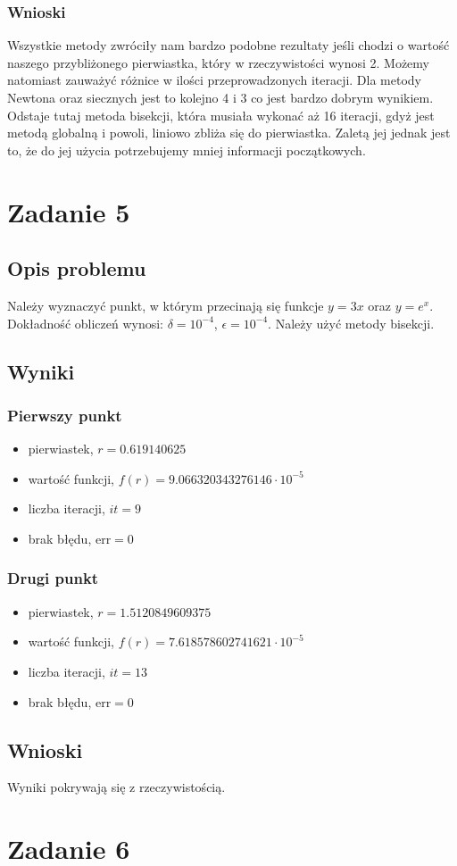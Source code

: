 \documentclass{article}
\begin{document}
\subsubsection*{Wnioski}
	Wszystkie metody zwróciły nam bardzo podobne rezultaty jeśli chodzi o wartość naszego przybliżonego pierwiastka, który w rzeczywistości wynosi 2. Możemy natomiast zauważyć różnice w ilości przeprowadzonych iteracji. Dla metody Newtona oraz siecznych jest to kolejno 4 i 3 co jest bardzo dobrym wynikiem. Odstaje tutaj metoda bisekcji, która musiała wykonać aż 16 iteracji, gdyż jest metodą globalną i powoli, liniowo zbliża się do pierwiastka. Zaletą jej jednak jest to, że do jej użycia potrzebujemy mniej informacji początkowych.

\section*{Zadanie 5}
\subsection*{Opis problemu}
	Należy wyznaczyć punkt, w którym przecinają się funkcje $y = 3x$ oraz $y = e^x$. Dokładność obliczeń wynosi: $\delta = 10^{-4}$, $\epsilon = 10^{-4}$. Należy użyć metody bisekcji.
\subsection*{Wyniki}
\subsubsection*{Pierwszy punkt}
	\begin{itemize}
		\item pierwiastek, $r = 0.619140625$
	    \item wartość funkcji, $f(r) = 9.066320343276146 \cdot 10^{-5}$
	    \item liczba iteracji, $it = 9$
	    \item brak błędu, $\mathrm{err} = 0$
	\end{itemize}
\subsubsection*{Drugi punkt}
	\begin{itemize}
		\item pierwiastek, $r = 1.5120849609375$
	    \item wartość funkcji, $f(r) = 7.618578602741621 \cdot 10^{-5}$
	    \item liczba iteracji, $it = 13$
	    \item brak błędu, $\mathrm{err} = 0$
	\end{itemize}
\subsection*{Wnioski}
	Wyniki pokrywają się z rzeczywistością.

\section*{Zadanie 6}
\end{document}
